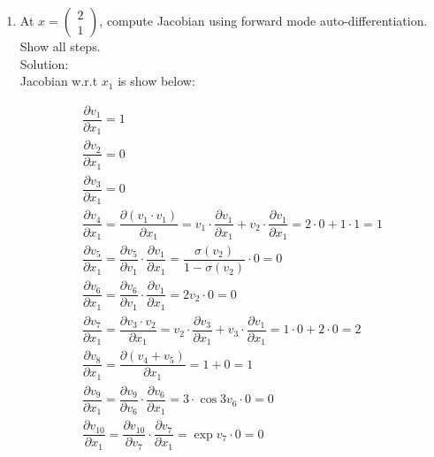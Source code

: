 \documentclass[12pt]{article}
\begin{document}
\begin{enumerate}[label=(\roman*)]
\newpage
\item At 
$x=
\begin{pmatrix}
2\\1
\end{pmatrix}$,
compute Jacobian using forward mode auto-differentiation. Show all steps.\\
Solution:\\
Jacobian w.r.t $x_1$ is show below:\\

\begin{fleqn}
    \begin{gather*}
        \dfrac{\partial v_{1}}{\partial x_{1}} =  1 \\
        \dfrac{\partial v_{2}}{\partial x_{1}} =  0  \\
        \dfrac{\partial v_{3}}{\partial x_{1}} = 0  \\
        \dfrac{\partial v_{4}}{\partial x_{1}} = \dfrac{\partial (v_{1}\cdot v_1)}{\partial x_{1}} = v_1\cdot\dfrac{\partial v_{1}}{\partial x_{1}} + v_2\cdot\dfrac{\partial v_{1}}{\partial x_{1}} = 2\cdot 0 + 1\cdot 1 = 1   \\
        \dfrac{\partial v_{5}}{\partial x_{1}} = \dfrac{\partial v_{5}}{\partial v_{1}}\cdot \dfrac{\partial v_{1}}{\partial x_{1}} =  \dfrac{\sigma(v_2)}{1-\sigma(v_2)} \cdot 0 = 0  \\ 
        \dfrac{\partial v_{6}}{\partial x_{1}} = \dfrac{\partial v_{6}}{\partial v_{1}} \cdot \dfrac{\partial v_{1}}{\partial x_{1}} = 2 v_2 \cdot 0 = 0 \\
        \dfrac{\partial v_{7}}{\partial x_{1}} = \dfrac{\partial v_{3}\cdot v_2}{\partial x_{1}} = v_2 \cdot \dfrac{\partial v_{3}}{\partial x_{1}} + v_3 \cdot \dfrac{\partial v_{1}}{\partial x_{1}} = 1 \cdot 0 + 2 \cdot 0 = 2 \\ 
        \dfrac{\partial v_{8}}{\partial x_{1}} = \dfrac{\partial (v_{4} + v_5)}{\partial x_{1}} = 1 + 0 = 1  \\
        \dfrac{\partial v_{9}}{\partial x_{1}} = \dfrac{\partial v_{9}}{\partial v_{6}} \cdot \dfrac{\partial v_{6}}{\partial x_{1}} = 3 \cdot \cos{3v_6} \cdot 0 =  0  \\
        \dfrac{\partial v_{10}}{\partial x_{1}} = \dfrac{\partial v_{10}}{\partial v_{7}} \cdot \dfrac{\partial v_{7}}{\partial x_{1}}  = \exp{v_7} \cdot 0 = 0  \\

\end{gather*}
\end{fleqn}
\end{enumerate}
\end{document}
